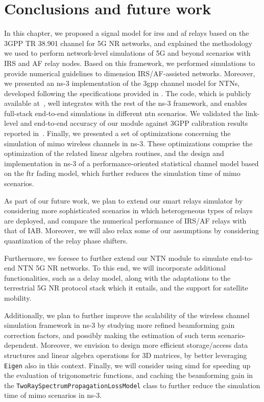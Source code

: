 \section{Conclusions and future work}
\label{sec:conc}


In this chapter, we proposed a signal model for \glspl{irs} and \gls{af} relays based on the 3GPP TR 38.901 channel for 5G NR networks, and explained the methodology we used to perform network-level simulations of 5G and beyond scenarios with IRS and AF relay nodes.
Based on this framework, we performed simulations to provide numerical guidelines to dimension IRS/AF-assisted networks. 
Moreover, we presented an ns-3 implementation of the \gls{3gpp} channel model for NTNs, developed following the specifications provided in \cite{38811}. The code, which is publicly available at~\cite{ntngitlab}, well integrates with the rest of the ns-3 framework, and enables full-stack end-to-end simulations in different \gls{ntn} scenarios. We validated the link-level and end-to-end accuracy of our module against 3GPP calibration results reported in~\cite{38821}. 
Finally, we presented a set of optimizations concerning the simulation of \gls{mimo} wireless channels in ns-3. These optimizations comprise the optimization of the related linear algebra routines, and the design and implementation in ns-3 of a performance-oriented statistical channel model based on the \gls{ftr} fading model, which further reduces the simulation time of \gls{mimo} scenarios. %


As part of our future work, we plan to extend our smart relays simulator by considering more sophisticated
scenarios in which heterogeneous types of relays are deployed, and compare the numerical performance of
IRS/AF relays with that of IAB. Moreover, we will also relax some of our assumptions by considering quantization of the
relay phase shifters.

Furthermore, we foresee to further extend our NTN module to simulate end-to-end NTN 5G NR networks. To this end, we will incorporate additional functionalities, such as a delay model, along with the adaptations to the terrestrial 5G NR protocol stack which it entails, and the support for satellite mobility.

Additionally, we plan to further improve the scalability of the wireless channel simulation framework in ns-3 by studying more refined beamforming gain correction factors, and possibly making the estimation of such term scenario-dependent. Moreover, we envision to design more efficient storage/access data structures and linear algebra operations for 3D matrices, by better leveraging \texttt{Eigen} also in this context.
Finally, we will consider using \gls{simd} for speeding up the evaluation of trigonometric functions, and caching the beamforming gain in the \texttt{Two\-Ray\-Spectrum\-Propagation\-Loss\-Model} class to further reduce the simulation time of \gls{mimo} scenarios in ns-3.

